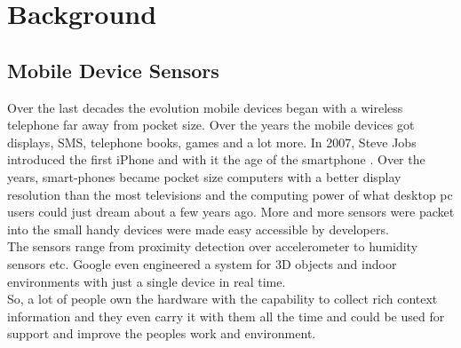 \chapter{Background}

\section{Mobile Device Sensors}
Over the last decades the evolution mobile devices began with a wireless telephone far away from pocket size. Over the years the mobile devices got displays, SMS, telephone books, games and a lot more. In 2007, Steve Jobs introduced the first iPhone and with it the age of the smartphone  \cite{laugesen2010factors}. Over the years, smart-phones became pocket size computers with a better display resolution than the most televisions and the computing power of what desktop pc users could just dream about a few years ago. More and more sensors were packet into the small handy devices were made easy accessible by developers.\\
The sensors range from proximity detection over accelerometer to humidity sensors etc. Google even engineered a system for 3D objects and indoor environments with just a single device in real time.\\
So, a lot of people own the hardware with the capability to collect rich context information and they even carry it with them all the time and could be used for support and improve the peoples work and environment.


